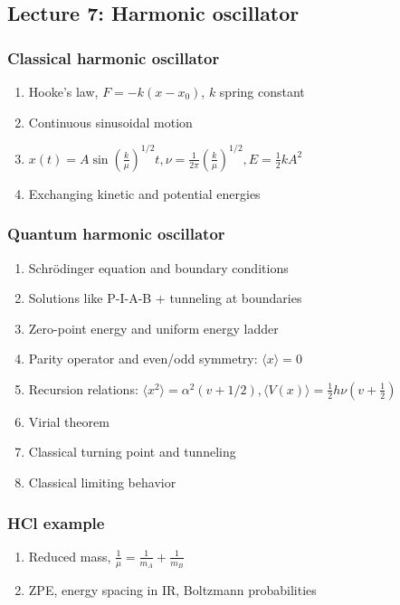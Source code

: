 \documentclass[11pt]{article}
\begin{document}
\subsection{Lecture 7: Harmonic oscillator}
\label{sec:org6c65341}
\subsubsection{Classical harmonic oscillator}
\label{sec:orge2f813e}
\begin{enumerate}
\item Hooke's law, \(F=-k(x-x_0)\), \(k\) spring constant
\item Continuous sinusoidal motion
\item \(x(t)=A \sin(\frac{k}{\mu})^{1/2}t, \nu=\frac{1}{2\pi}(\frac{k}{\mu})^{1/2}, E=\frac{1}{2}kA^2\)
\item Exchanging kinetic and potential energies
\end{enumerate}
\subsubsection{Quantum harmonic oscillator}
\label{sec:orgf1a7c04}
\begin{enumerate}
\item Schr\"{o}dinger equation and boundary conditions
\item Solutions like P-I-A-B + tunneling at boundaries
\item Zero-point energy and uniform energy ladder
\item Parity operator and even/odd symmetry:  \(\langle x \rangle =0\)
\item Recursion relations: \(\langle x^2 \rangle =
      \alpha^2 (v+1/2), \langle V(x) \rangle = \frac{1}{2} h\nu (v+\frac{1}{2})\)
\item Virial theorem
\item Classical turning point and tunneling
\item Classical limiting behavior
\end{enumerate}
\subsubsection{HCl example}
\label{sec:orgb464825}
\begin{enumerate}
\item Reduced mass, \(\frac{1}{\mu}=\frac{1}{m_A}+\frac{1}{m_B}\)
\item ZPE, energy spacing in IR, Boltzmann probabilities
\end{enumerate}
\end{document}
